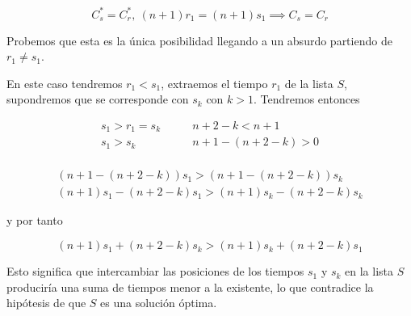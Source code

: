 \documentclass[a4]{article}
\begin{document}
\[C_s^* = C_r^*, \ (n+1)r_1=(n+1)s_1 \implies C_s = C_r\]

Probemos que esta es la única posibilidad llegando a un absurdo
partiendo de $r_1 \neq s_1$.

En este caso tendremos $r_1 < s_1$, extraemos el
tiempo $r_1$ de la lista $S$, supondremos que se corresponde con $s_k$
con $k > 1$. Tendremos entonces

\begin{align*}
  s_1 > r_1 = s_k& \qquad n+2-k < n+1 \\
  s_1 > s_k& \qquad n+1 - (n+2-k) > 0 \\
\end{align*}

\vspace{-15mm}

\begin{align*}    
  (n+1-(n+2-k))s_1 > (n+1-(n+2-k))s_k \\
  (n+1)s_1 - (n+2-k)s_1 > (n+1)s_k - (n+2-k)s_k
\end{align*}

y por tanto

\[(n+1)s_1 + (n+2-k)s_k > (n+1)s_k + (n+2-k)s_1\]

Esto significa que intercambiar las posiciones de los tiempos $s_1$ y
$s_k$ en la lista $S$ produciría una suma de tiempos menor a la
existente, lo que contradice la hipótesis de que $S$ es una solución
óptima.

\hfill\qedsymbol
\end{document}
